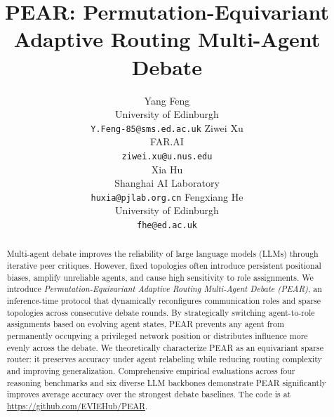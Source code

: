 \documentclass[11pt]{article}
\title{PEAR: Permutation-Equivariant Adaptive Routing Multi-Agent Debate}
\author{%
 Yang Feng\\
 University of Edinburgh\\
 \texttt{Y.Feng-85@sms.ed.ac.uk}
 \And
   Ziwei Xu \\
   FAR.AI \\
   \texttt{ziwei.xu@u.nus.edu}\\
   \AND
   Xia Hu\\
   Shanghai AI Laboratory\\
   \texttt{huxia@pjlab.org.cn}
   \And
   Fengxiang He \\%
    University of Edinburgh \\
   \texttt{fhe@ed.ac.uk} }
\begin{document}
\maketitle
\begin{abstract}
Multi-agent debate improves the reliability of large language models (LLMs) through iterative peer critiques. However, fixed topologies often introduce persistent positional biases, amplify unreliable agents, and cause high sensitivity to role assignments.
We introduce \textit{Permutation-Equivariant Adaptive Routing Multi-Agent Debate (PEAR)}, an inference-time protocol that dynamically reconfigures communication roles and sparse topologies across consecutive debate rounds.
By strategically switching agent-to-role assignments based on evolving agent states, PEAR prevents any agent from permanently occupying a privileged network position or distributes influence more evenly across the debate. We theoretically characterize PEAR as an equivariant sparse router: it preserves accuracy under agent relabeling while reducing routing complexity and improving generalization. Comprehensive empirical evaluations across four reasoning benchmarks and six diverse LLM backbones demonstrate PEAR significantly improves average accuracy over the strongest debate baselines. The code is at \url{https://github.com/EVIEHub/PEAR}.
\end{abstract}
\end{document}

